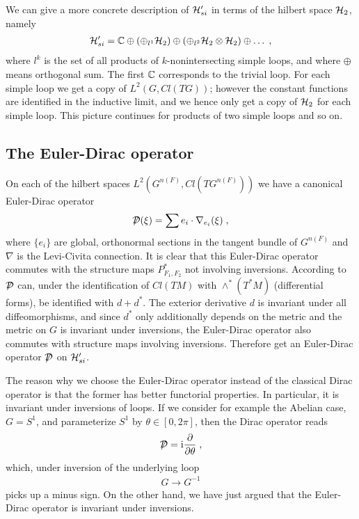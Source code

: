 \documentclass[12pt]{article}
\newcommand{\ba}{\begin{eqnarray}}
\newcommand{\ea}{\end{eqnarray}}
\def\p{\pi}
\def\cd{{\cal D}}
\def\ch{{\cal H}}
\newcommand{\pa}{\partial}
\newcommand{\C}{{\Bbb C}}
\begin{document}
We can give a more concrete description of $\ch'_{si}$ in terms of the
hilbert space $\ch_2$, namely
\ba 
\ch'_{si}=\C \oplus (\oplus_{l^1}\ch_2) \oplus
(\oplus_{l^2}\ch_2\otimes \ch_2)\oplus
\ldots\;,
\label{h2}
\ea
 where $l^k$ is the set of all products of $k$-nonintersecting simple loops,
and where $\oplus$ means orthogonal sum. The first $\C$ corresponds to the
trivial loop. For each simple loop we get a copy of $L^2(G,Cl(TG))$; however
the constant functions are identified in the inductive limit, and we hence only get a
copy of $\ch_2$ for each simple loop. This picture continues for products of
two simple loops and so on.








\subsection{The Euler-Dirac operator}

On each of the hilbert spaces $L^2(G^{n(F)},Cl(TG^{n(F)}))$ we have a
 canonical Euler-Dirac operator 
\ba
\displaystyle{\not} \cd (\xi)= \sum e_i\cdot \nabla_{e_i}(\xi)\;,
\label{EDi}
\ea
where $\{e_i\}$ are global, orthonormal sections in the tangent bundle of
$G^{n(F)}$ and $\nabla$ is the Levi-Civita connection.
 It is clear that this Euler-Dirac operator commutes with the structure maps
 $P_{F_1,F_2}^*$ not involving inversions. According to \cite{spingeometri}
 $\displaystyle{\not}\cd$ can, under the identification of $Cl(TM)$ with
 $\wedge^* (T^*M)$ (differential forms), be identified with $d+d^*$.
  The exterior derivative $d$ is invariant under all diffeomorphisms, and since
  $d^*$ only additionally depends on the metric and the metric on $G$ is
  invariant under inversions, the Euler-Dirac operator also commutes with
  structure maps involving inversions. Therefore get an Euler-Dirac operator $\displaystyle{\not} \cd $ on $\ch'_{si}$. 

The reason why we choose the Euler-Dirac operator instead of the classical
Dirac operator is that the former has better functorial properties. In
particular, it is invariant under inversions of loops. If we consider for
example the Abelian case, $G=S^1$, and parameterize $S^1$ by $\theta\in [0,2\p]$,
then the Dirac operator reads
\ba
\displaystyle{\not} \cd = {\rm{i}}\frac{\pa}{\pa \theta}\;,
\label{D}
\ea
which, under inversion of the underlying loop 
\ba
G\to G^{-1}
\label{inve}
\ea 
picks up a minus sign. On the
other hand, we have just argued that the Euler-Dirac operator is invariant
under inversions. 
\end{document}
